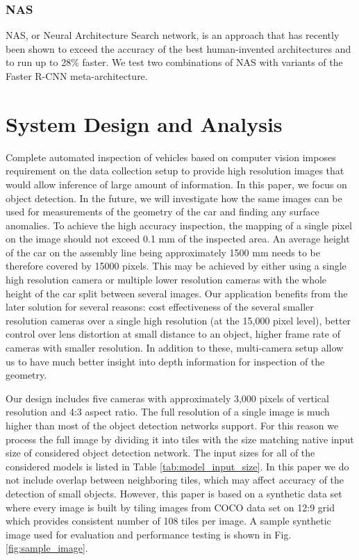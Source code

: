 \documentclass[conference]{IEEEtran}
\begin{document}
\subsubsection{NAS}
NAS, or Neural Architecture Search network, is an approach that  has recently been shown to exceed the accuracy of the best human-invented architectures and to run up to 28\% faster.
We test two combinations of NAS with variants of the Faster R-CNN meta-architecture.


\section{System Design and Analysis}
Complete automated inspection of vehicles based on computer vision imposes requirement on the data collection setup to provide high resolution images that would allow inference of large amount of information. In this paper, we focus on object detection. In the future, we will investigate how the same images can be used for measurements of the geometry of the car and finding any surface anomalies. To achieve the high accuracy inspection, the mapping of a single pixel on the image should not exceed 0.1 mm of the inspected area. An average height of the car on the assembly line being approximately 1500 mm needs to be therefore covered by 15000 pixels. This may be achieved by either using a single high resolution camera or multiple lower resolution cameras with the whole height of the car split between several images. Our application benefits from the later solution for several reasons: cost effectiveness of the several smaller resolution cameras over a single high resolution (at the 15,000 pixel level), better control over lens distortion at small distance to an object, higher frame rate of cameras with smaller resolution. In addition to these, multi-camera setup allow us to have much better insight into depth information for inspection of the geometry. 

Our design includes five cameras with approximately 3,000 pixels of vertical resolution and 4:3 aspect ratio. The full resolution of a single image is much higher than most of the object detection networks support. For this reason we process the full image by dividing it into tiles with the size matching native input size of considered object detection network. The input sizes for all of the considered models is listed in Table \ref{tab:model_input_size}. In this paper we do not include overlap between neighboring tiles, which may affect accuracy of the detection of small objects. However, this paper is based on a synthetic data set where every image is built by tiling images from COCO data set on 12:9 grid which provides consistent number of 108 tiles per image. 
A sample synthetic image used for evaluation and performance testing is shown in Fig. \ref{fig:sample_image}.
\end{document}
